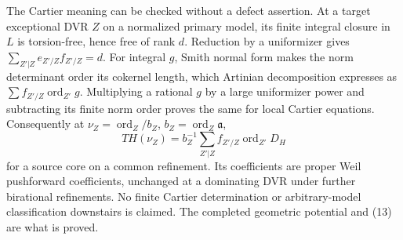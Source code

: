The Cartier meaning can be checked without a defect assertion. At a target exceptional DVR $Z$ on a normalized primary model, its finite integral closure in $L$ is torsion-free, hence free of rank $d$. Reduction by a uniformizer gives $\sum_{Z'|Z}e_{Z'/Z}f_{Z'/Z}=d$. For integral $g$, Smith normal form makes the norm determinant order its cokernel length, which Artinian decomposition expresses as $\sum f_{Z'/Z}\operatorname{ord}_{Z'}g$. Multiplying a rational $g$ by a large uniformizer power and subtracting its finite norm order proves the same for local Cartier equations. Consequently at $\nu_Z=\operatorname{ord}_Z/b_Z$, $b_Z=\operatorname{ord}_Z\mathfrak a$,
\[
 TH(\nu_Z)=b_Z^{-1}\sum_{Z'|Z} f_{Z'/Z}\operatorname{ord}_{Z'}D_H
\]
for a source core on a common refinement. Its coefficients are proper Weil pushforward coefficients, unchanged at a dominating DVR under further birational refinements. No finite Cartier determination or arbitrary-model classification downstairs is claimed. The completed geometric potential and (13) are what is proved.
